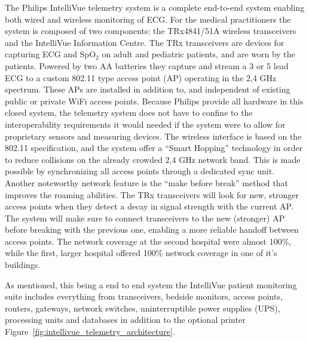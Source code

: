 The Philips IntelliVue telemetry system is a complete end-to-end system enabling both wired and wireless monitoring of ECG. For the medical practitioners the system is composed of two components: the TRx4841/51A wireless transceivers and the IntelliVue Information Centre. The TRx transceivers are devices for capturing ECG and SpO$_2$ on adult and pediatric patients, and are worn by the patients. Powered by two AA batteries they  capture and stream a 3 or 5 lead ECG to a custom 802.11 type access point (AP) operating in the 2,4 GHz spectrum. These APs are installed in addition to, and independent of existing public or private WiFi access points. Because Philips provide all hardware in this closed system, the telemetry system does not have to confine to the interoperability requirements it would needed if the system were to allow for proprietary sensors and measuring devices. The wireless interface is based on the 802.11 specification, and the system offer a ``Smart Hopping'' technology in order to reduce collisions on the already crowded 2,4 GHz network band. This is made possible by synchronizing all access points through a dedicated sync unit. Another noteworthy network feature is the ``make before break'' method that improves the roaming abilities. The TRx transceivers will look for new, stronger access points when they detect a decay in signal strength with the current AP. The system will make sure to connect transceivers to the new (stronger) AP before breaking with the previous one, enabling a more reliable handoff between access points. The network coverage at the second hospital were almost 100\%, while the first, larger hospital offered 100\% network coverage in one of it's buildings.

As mentioned, this being a end to end system the IntelliVue patient monitoring suite includes everything from transceivers, bedside monitors, access points, routers, gateways, network switches, uninterruptible power supplies (UPS), processing units and databases in addition to the optional printer Figure~\ref{fig:intellivue_telemetry_architecture}.


